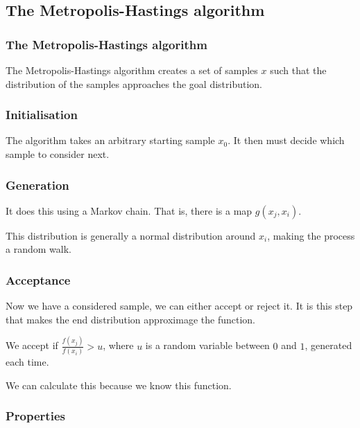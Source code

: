 
\subsection{The Metropolis-Hastings algorithm}

\subsubsection{The Metropolis-Hastings algorithm}

The Metropolis-Hastings algorithm creates a set of samples \(x\) such that the distribution of the samples approaches the goal distribution.

\subsubsection{Initialisation}

The algorithm takes an arbitrary starting sample \(x_0\). It then must decide which sample to consider next.

\subsubsection{Generation}

It does this using a Markov chain. That is, there is a map \(g(x_j, x_i)\).

This distribution is generally a normal distribution around \(x_i\), making the process a random walk.

\subsubsection{Acceptance}

Now we have a considered sample, we can either accept or reject it. It is this step that makes the end distribution approximage the function.

We accept if \(\frac{f(x_j)}{f(x_i)}>u\), where \(u\) is a random variable between \(0\) and \(1\), generated each time.

We can calculate this because we know this function.

\subsubsection{Properties}


